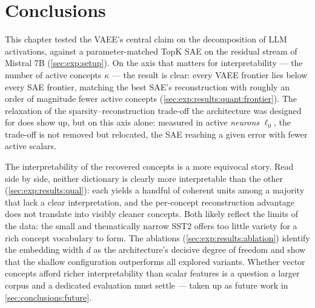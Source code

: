 \section*{Conclusions}

This chapter tested the \ac{VAEE}'s central claim on the decomposition of
\ac{LLM} activations, against a parameter-matched TopK \ac{SAE} on the residual
stream of Mistral 7B (\cref{sec:exp:setup}). On
the axis that matters for interpretability --- the number of active concepts
$\kappa$ --- the result is clear: every \ac{VAEE} frontier lies below every
\ac{SAE} frontier, matching the best \ac{SAE}'s reconstruction with roughly an
order of magnitude fewer active concepts
(\cref{sec:exp:results:quant:frontier}).
The relaxation of the sparsity--reconstruction trade-off the architecture was
designed for does show up, but on this axis alone: measured in active
\textit{neurons} $\ell_{0}$, the trade-off is not removed but relocated, the
\ac{SAE} reaching a given error with fewer active scalars.

The interpretability of the recovered concepts is a more equivocal story. Read
side by side, neither dictionary is clearly more interpretable than the other
(\cref{sec:exp:results:qual}): each
yields a handful of coherent units among a majority that lack a clear
interpretation, and the per-concept reconstruction advantage does not translate
into visibly cleaner concepts. Both likely reflect the limits of the data: the
small and thematically narrow \ac{SST2} offers too little variety for a rich
concept vocabulary to form. The ablations
(\cref{sec:exp:results:ablation}) identify
the embedding width $d$ as the architecture's decisive degree of freedom and
show that the shallow configuration outperforms all explored variants. Whether
vector concepts afford richer interpretability than scalar features is a
question a larger corpus and a dedicated evaluation must settle --- taken up as
future work in \cref{sec:conclusions:future}.


